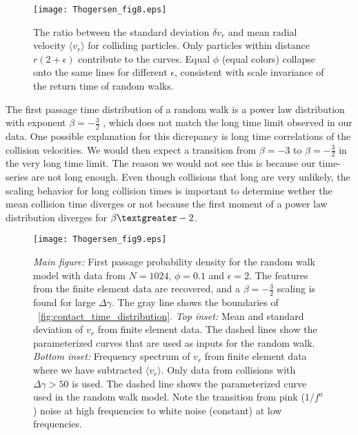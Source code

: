 \documentclass[aps,pre,twocolumn,letterpaper,floatfix,showpacs]{revtex4}
\begin{document}
\begin{figure}
\texttt{[image: Thogersen\_fig8.eps]}
\caption{The ratio between the standard deviation $\delta v_r$ and mean radial velocity $\langle v_r \rangle$ for colliding particles. Only particles within distance $r(2+\epsilon)$ contribute to the curves. Equal $\phi$ (equal colors) collapse onto the same lines for different $\epsilon$, consistent with scale invariance of the return time of random walks.
\label{fig:std_mean_coll}}
\end{figure}

The first passage time distribution of a random walk is a power law distribution with exponent $\beta = -\frac{3}{2}$ \cite{redner2001guide}, which does not match the long time limit observed in our data. One possible explanation for this dicrepancy is long time correlations of the collision velocities. We would then expect a transition from $\beta = -3$ to $\beta = -\frac{3}{2}$ in the very long time limit. The reason we would not see this is because our time-series are not long enough.  Even though collisions that long are very unlikely, the scaling behavior for long collision times is important to determine wether the mean collision time diverges or not because the first moment of a power law distribution diverges for $\beta \textgreater -2$.

\begin{figure}[h!]
\texttt{[image: Thogersen\_fig9.eps]}
\caption{\emph{Main figure:} First passage probability density for the random walk model with data from $N = 1024$, $\phi = 0.1$ and $\epsilon = 2$.  The features from the finite element data are recovered, and a $\beta = -\frac{3}{2}$ scaling is found for large $\Delta \gamma$. The gray line shows the boundaries of \figurename~\ref{fig:contact_time_distribution}. \emph{Top inset:} Mean and standard deviation of $v_r$ from finite element data. The dashed lines show the parameterized curves that are used as inputs for the random walk. \emph{Bottom inset:} Frequency spectrum of $v_r$ from finite element data where we have subtracted $\langle v_r \rangle$. Only data from collisions with $\Delta \gamma > 50$ is used. The dashed line shows the parameterized curve used in the random walk model. Note the transition from pink ($1/f^a$) noise at high frequencies to white noise (constant) at low frequencies.
\label{fig:return_time_random_walk}}
\end{figure}
\end{document}
